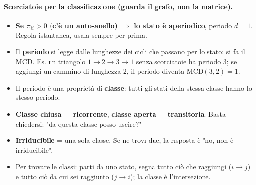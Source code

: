 \documentclass[12pt]{extarticle} %
\begin{document}
\paragraph{Scorciatoie per la classificazione (guarda il grafo, non la matrice).}
\begin{itemize}
    \item \textbf{Se $\pi_{ii} > 0$ (c'è un auto-anello) $\Rightarrow$ lo stato è aperiodico}, periodo $d=1$. Regola istantanea, usala sempre per prima.
    \item Il \textbf{periodo} si legge dalle lunghezze dei cicli che passano per lo stato: si fa il MCD. {\footnotesize Es. un triangolo $1\to2\to3\to1$ senza scorciatoie ha periodo 3; se aggiungi un cammino di lunghezza 2, il periodo diventa $\mathrm{MCD}(3,2)=1$.}
    \item Il periodo è una proprietà di \textbf{classe}: tutti gli stati della stessa classe hanno lo stesso periodo.
    \item \textbf{Classe chiusa = ricorrente}, \textbf{classe aperta = transitoria}. Basta chiedersi: "da questa classe posso uscire?"
    \item \textbf{Irriducibile} = una sola classe. Se ne trovi due, la risposta è "no, non è irriducibile".
    \item Per trovare le classi: parti da uno stato, segna tutto ciò che raggiungi ($i \to j$) e tutto ciò da cui sei raggiunto ($j \to i$); la classe è l'intersezione.
\end{itemize}
\end{document}
